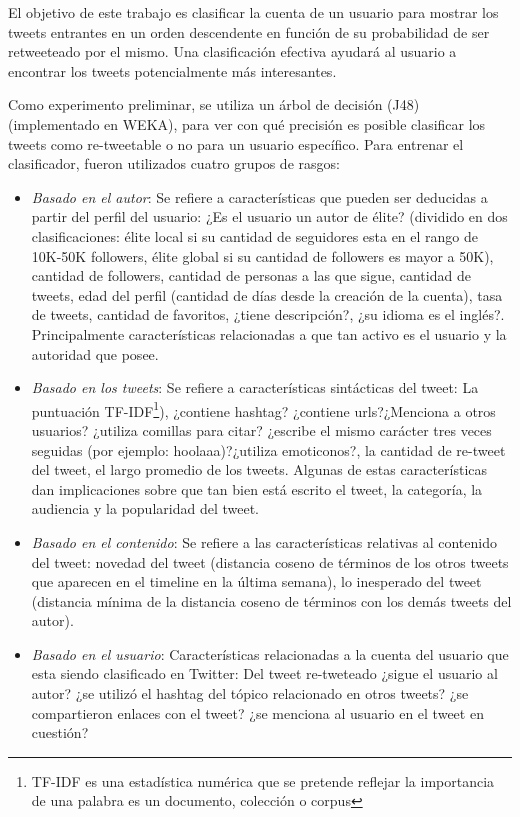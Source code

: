 El objetivo de este trabajo es clasificar la cuenta de un usuario para mostrar los tweets entrantes en un orden descendente en función de su probabilidad de ser retweeteado por el mismo. Una clasificación efectiva ayudará al usuario a encontrar los tweets potencialmente más interesantes. 

Como experimento preliminar, se utiliza un árbol de decisión (J48) (implementado en WEKA), para ver con qué precisión es posible clasificar los tweets como re-tweetable o no para un usuario específico. Para entrenar el clasificador, fueron utilizados cuatro grupos de rasgos:

\begin{itemize}
	\item \textit{Basado en el autor}: Se refiere a características que pueden ser deducidas a partir del perfil del usuario: ¿Es el usuario un autor de élite? (dividido en dos clasificaciones: élite local si su cantidad de seguidores esta en el rango de 10K-50K followers, élite global si su cantidad de followers es mayor a 50K), cantidad de followers, cantidad de personas a las que sigue, cantidad de tweets,  edad del perfil (cantidad de días desde la creación de la cuenta), tasa de tweets, cantidad de favoritos, ¿tiene descripción?, ¿su idioma es el inglés?. Principalmente características relacionadas a que tan activo es el usuario y la autoridad que posee.
	
	\item \textit{Basado en los tweets}: Se refiere a características sintácticas del tweet: La puntuación TF-IDF\footnote{TF-IDF es una estadística numérica que se pretende reflejar la importancia de una palabra es un documento, colección o corpus}), ¿contiene hashtag? ¿contiene urls?¿Menciona a otros usuarios? ¿utiliza comillas para citar? ¿escribe el mismo carácter tres veces seguidas (por ejemplo: hoolaaa)?¿utiliza emoticonos?, la cantidad de re-tweet del tweet, el largo promedio de los tweets. Algunas de estas características dan implicaciones sobre que tan bien está escrito el tweet, la categoría, la audiencia y la popularidad del tweet.
	
	\item \textit{Basado en el contenido}: Se refiere a las características relativas al contenido del tweet: novedad del tweet (distancia coseno de términos de los otros tweets que aparecen en el timeline en la última semana), lo inesperado del tweet (distancia mínima de la distancia coseno de términos con los demás tweets del autor).
	
	\item \textit{Basado en el usuario}: Características relacionadas a la cuenta del usuario que esta siendo clasificado en Twitter: Del tweet re-tweteado ¿sigue el usuario al autor? ¿se utilizó el hashtag del tópico relacionado en otros tweets? ¿se compartieron enlaces con el tweet? ¿se menciona al usuario en el tweet en cuestión?
\end{itemize}

